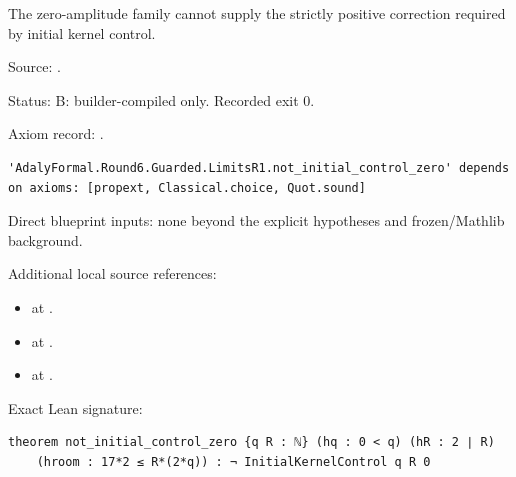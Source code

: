 \begin{theorem}[bp-062]
\label{bp-062}
\uses{}
\leanok
The zero-amplitude family cannot supply the strictly positive correction required by initial kernel control.

\par Source: \texttt{}.
\par Status: B: builder-compiled only. Recorded exit 0.
\par Axiom record: \texttt{}.
\begin{verbatim}
'AdalyFormal.Round6.Guarded.LimitsR1.not_initial_control_zero' depends on axioms: [propext, Classical.choice, Quot.sound]
\end{verbatim}
\par Direct blueprint inputs: none beyond the explicit hypotheses and frozen/Mathlib background.
\par Additional local source references:
\begin{itemize}
\item \texttt{} at \texttt{}.
\item \texttt{} at \texttt{}.
\item \texttt{} at \texttt{}.
\end{itemize}
\par Exact Lean signature:
\begin{verbatim}
theorem not_initial_control_zero {q R : ℕ} (hq : 0 < q) (hR : 2 ∣ R)
    (hroom : 17*2 ≤ R*(2*q)) : ¬ InitialKernelControl q R 0
\end{verbatim}
\end{theorem}

